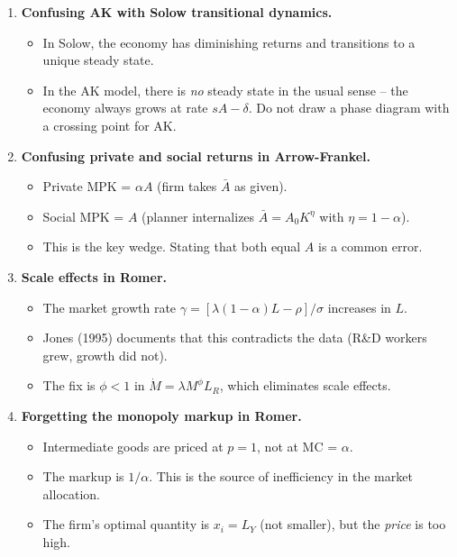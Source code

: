 \documentclass[a4paper,11pt]{article}
\begin{document}
\begin{enumerate}
    \item \textbf{Confusing AK with Solow transitional dynamics.}
    \begin{itemize}
        \item In Solow, the economy has diminishing returns and transitions to a unique steady state.
        \item In the AK model, there is \emph{no} steady state in the usual sense -- the economy always grows at rate $sA - \delta$. Do not draw a phase diagram with a crossing point for AK.
    \end{itemize}

    \item \textbf{Confusing private and social returns in Arrow-Frankel.}
    \begin{itemize}
        \item Private MPK = $\alpha A$ (firm takes $\bar{A}$ as given).
        \item Social MPK = $A$ (planner internalizes $\bar{A} = A_0 K^\eta$ with $\eta = 1 - \alpha$).
        \item This is the key wedge. Stating that both equal $A$ is a common error.
    \end{itemize}

    \item \textbf{Scale effects in Romer.}
    \begin{itemize}
        \item The market growth rate $\gamma = [\lambda(1-\alpha)L - \rho]/\sigma$ increases in $L$.
        \item Jones (1995) documents that this contradicts the data (R\&D workers grew, growth did not).
        \item The fix is $\phi < 1$ in $\dot{M} = \lambda M^\phi L_R$, which eliminates scale effects.
    \end{itemize}

    \item \textbf{Forgetting the monopoly markup in Romer.}
    \begin{itemize}
        \item Intermediate goods are priced at $p = 1$, not at MC = $\alpha$.
        \item The markup is $1/\alpha$. This is the source of inefficiency in the market allocation.
        \item The firm's optimal quantity is $x_i = L_Y$ (not smaller), but the \emph{price} is too high.
    \end{itemize}


\end{enumerate}
\end{document}
